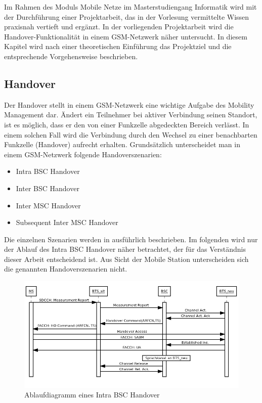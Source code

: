 
Im Rahmen des Moduls Mobile Netze im Masterstudiengang Informatik wird mit der Durchführung einer Projektarbeit, das in der Vorlesung vermittelte Wissen praxisnah vertieft und  ergänzt. In der vorliegenden Projektarbeit wird die Handover-Funktionalität in einem GSM-Netzwerk näher untersucht. In diesem Kapitel wird nach einer theoretischen Einführung das Projektziel und die entsprechende Vorgehensweise beschrieben.

\subsection{Handover}\label{sec:handover}

Der Handover stellt in einem GSM-Netzwerk eine wichtige Aufgabe des Mobility Management dar. Ändert ein Teilnehmer bei aktiver Verbindung seinen Standort, ist es möglich, dass er den von einer Funkzelle abgedeckten Bereich verlässt. In einem solchen Fall wird die Verbindung durch den Wechsel zu einer benachbarten Funkzelle (Handover) aufrecht erhalten. Grundsätzlich unterscheidet man in einem GSM-Netzwerk folgende Handoverszenarien:

\begin{itemize}
 \item Intra BSC Handover
 \item Inter BSC Handover
 \item Inter MSC Handover
 \item Subsequent Inter MSC Handover
\end{itemize}

Die einzelnen Szenarien werden in \cite{bib:grundkursmks} ausführlich beschrieben. Im folgenden wird nur der Ablauf des Intra BSC Handover näher betrachtet, der für das Verständnis dieser Arbeit entscheidend ist. Aus Sicht der Mobile Station unterscheiden sich die genannten Handoverszenarien nicht.

\begin{figure}[h!]
  \centering
  \includegraphics[width=\textwidth]{img/ablauf_handover}
  \caption{Ablaufdiagramm eines Intra BSC Handover}
  \label{fig:adhandover}
\end{figure}

